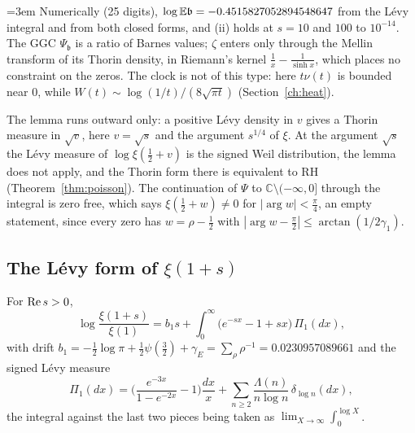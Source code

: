 \begingroup\emergencystretch=3em
Numerically (25 digits), $\log\mathbb{E}\mathfrak b=-0.4515827052894548647$ from the L\'evy integral and from both closed forms, and (ii) holds at $s=10$ and $100$ to $10^{-14}$. The GGC $\Psi_{\mathfrak b}$ is a ratio of Barnes values; $\zeta$ enters only through the Mellin transform of its Thorin density, in Riemann's kernel $\frac1x-\frac1{\sinh x}$, which places no constraint on the zeros. The clock is not of this type: here $t\nu(t)$ is bounded near $0$, while $W(t)\sim\log(1/t)/(8\sqrt{\pi t})$ (Section~\ref{ch:heat}).\par\endgroup

The lemma runs outward only: a positive L\'evy density in $v$ gives a Thorin measure in $\sqrt v$, here $v=\sqrt s$ and the argument $s^{1/4}$ of $\xi$. At the argument $\sqrt s$ the L\'evy measure of $\log\xi(\frac12+v)$ is the signed Weil distribution, the lemma does not apply, and the Thorin form there is equivalent to RH (Theorem~\ref{thm:poisson}). The continuation of $\Psi$ to $\mathbb C\setminus(-\infty,0]$ through the integral is zero free, which says $\xi(\frac12+w)\ne0$ for $|\arg w|<\frac\pi4$, an empty statement, since every zero has $w=\rho-\frac12$ with $|\arg w-\frac\pi2|\le\arctan(1/2\gamma_1)$.

\subsection{The L\'evy form of \texorpdfstring{$\xi(1+s)$}{xi(1+s)}}\label{bp:sec:levy}

\begin{proposition}\label{bp:prop:levy}
For $\operatorname{Re} s>0$,
\begin{equation}\label{bp:eq:levyform}
\log\frac{\xi(1+s)}{\xi(1)}=b_1s+\int_0^\infty\big(e^{-sx}-1+sx\big)\,\Pi_1(dx),
\end{equation}
with drift $b_1=-\frac12\log\pi+\frac12\psi(\frac32)+\gamma_E=\sum_\rho\rho^{-1}=0.0230957089661$ and the signed L\'evy measure
\[
\Pi_1(dx)=\Big(\frac{e^{-3x}}{1-e^{-2x}}-1\Big)\frac{dx}{x}+\sum_{n\ge2}\frac{\Lambda(n)}{n\log n}\,\delta_{\log n}(dx),
\]
the integral against the last two pieces being taken as $\lim_{X\to\infty}\int_0^{\log X}$.
\end{proposition}


